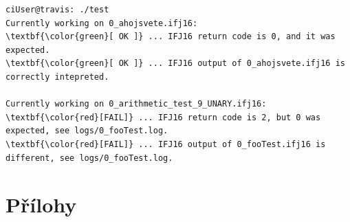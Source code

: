 \documentclass[a4paper,11pt]{article}
\begin{document}

\begin{Verbatim}
ciUser@travis: ./test
Currently working on 0_ahojsvete.ifj16:
\textbf{\color{green}[ OK ]} ... IFJ16 return code is 0, and it was expected.
\textbf{\color{green}[ OK ]} ... IFJ16 output of 0_ahojsvete.ifj16 is correctly intepreted.

Currently working on 0_arithmetic_test_9_UNARY.ifj16:
\textbf{\color{red}[FAIL]} ... IFJ16 return code is 2, but 0 was expected, see logs/0_fooTest.log.
\textbf{\color{red}[FAIL]} ... IFJ16 output of 0_fooTest.ifj16 is different, see logs/0_fooTest.log.
\end{Verbatim}

\section{Přílohy}
\end{document}
